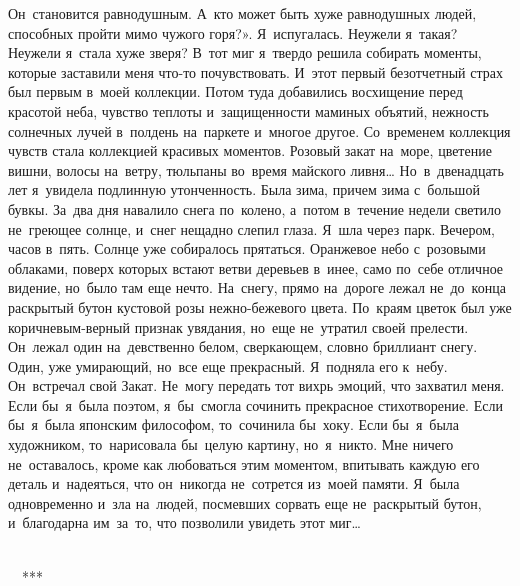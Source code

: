 Он~становится равнодушным.
А~кто может быть хуже равнодушных людей, способных пройти мимо чужого горя?».
Я~испугалась.
Неужели я~такая? Неужели я~стала хуже зверя? В~тот миг я~твердо решила собирать моменты, которые заставили меня что-то почувствовать.
И~этот первый безотчетный страх был первым в~моей коллекции.
Потом туда добавились восхищение перед красотой неба, чувство теплоты и~защищенности маминых объятий, нежность солнечных лучей в~полдень на~паркете и~многое другое.
Со~временем коллекция чувств стала коллекцией красивых моментов.
Розовый закат на~море, цветение вишни, волосы на~ветру, тюльпаны во~время майского ливня… Но~в~двенадцать лет я~увидела подлинную утонченность.
Была зима, причем зима с~большой бувкы.
За~два дня навалило снега по~колено, а~потом в~течение недели светило не~греющее солнце, и~снег нещадно слепил глаза.
Я~шла через парк.
Вечером, часов в~пять.
Солнце уже собиралось прятаться.
Оранжевое небо с~розовыми облаками, поверх которых встают ветви деревьев в~инее, само по~себе отличное видение, но~было там еще нечто.
На~снегу, прямо на~дороге лежал не~до~конца раскрытый бутон кустовой розы нежно-бежевого цвета.
По~краям цветок был уже коричневым-верный признак увядания, но~еще не~утратил своей прелести.
Он~лежал один на~девственно белом, сверкающем, словно бриллиант снегу.
Один, уже умирающий, но~все еще прекрасный.
Я~подняла его к~небу.
Он~встречал свой Закат.
Не~могу передать тот вихрь эмоций, что захватил меня.
Если бы~я~была поэтом, я~бы~смогла сочинить прекрасное стихотворение.
Если бы~я~была японским философом, то~сочинила бы~хоку.
Если бы~я~была художником, то~нарисовала бы~целую картину, но~я~никто.
Мне ничего не~оставалось, кроме как любоваться этим моментом, впитывать каждую его деталь и~надеяться, что он~никогда не~сотрется из~моей памяти.
Я~была одновременно и~зла на~людей, посмевших сорвать еще не~раскрытый бутон, и~благодарна им~за~то, что позволили увидеть этот миг…
 
~~~~~~~~~~~~~~~~~~~~~~~~~~~~~~~~~~~~~~~~~~~~~~~~~~~~~~~~~~~~~~~~~~~~~~~~~~***
 
